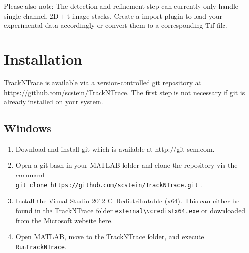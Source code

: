 \documentclass[11pt,onside]{report}
\numberwithin{equation}{chapter}
\def\CC{{C\nolinebreak[4]\hspace{-.05em}\raisebox{.3ex}{\tiny\bf ++}}}
\begin{document}
Please also note: The detection and refinement step can currently only handle single-channel, $\mathrm{2D}+\mathrm{t}$ image stacks. Create a import plugin to load your experimental data accordingly or convert them to a corresponding Tif file. \clearpage%

\tableofcontents \clearpage

\section{Installation}\label{sec:install}
TrackNTrace is available via a version-controlled git repository at \url{https://github.com/scstein/TrackNTrace}. The first step is not necessary if git is already installed on your system.
\subsection{Windows}
\begin{enumerate}
\item Download and install git which is available at \url{http://git-scm.com}.
\item Open a git bash in your MATLAB folder and clone the repository via the command \\ \texttt{git clone https://github.com/scstein/TrackNTrace.git} .
\item Install the Visual Studio 2012 \CC~Redistributable (x64). This can either be found in the TrackNTrace folder \texttt{external\textbackslash vcredist\textunderscore x64.exe} or downloaded from the Microsoft website \href{https://www.microsoft.com/en-us/download/details.aspx?id=30679}{here}.
\item Open MATLAB, move to the TrackNTrace folder, and execute \texttt{RunTrackNTrace}.
\end{enumerate}
\end{document}
